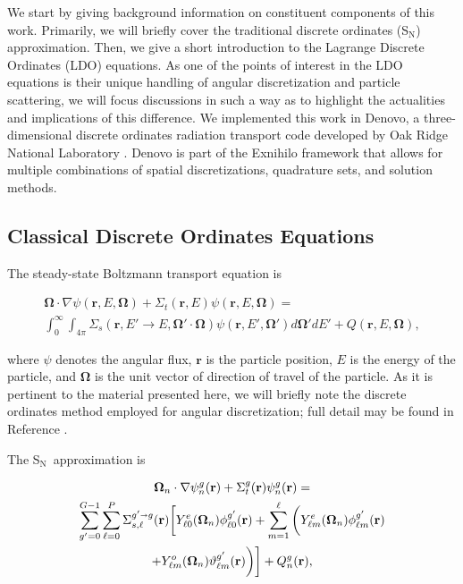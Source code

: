 \documentclass{article} %
\newcommand{\sa}{\shortrightarrow}
\newcommand{\bo}{\mathbf\Omega}
\newcommand{\vecr}{\textbf{r}}
\newcommand{\sn}{S$_\mathrm{N}$}
\newcommand{\Ye}[2]{\ensuremath{Y^e_{#1}(\bo_#2)}}
\newcommand{\Yo}[2]{\ensuremath{Y^o_{#1}(\bo_#2)}}
\begin{document}
We start by giving background information on constituent components of this
work. Primarily, we will briefly cover the traditional discrete ordinates
(\sn) approximation. Then, we give a short introduction to the Lagrange
Discrete Ordinates (LDO) equations. As one of the points of interest in the
LDO equations is their unique handling of angular discretization and particle
scattering, we will focus discussions in such a way as to highlight the
actualities and implications of this difference. We implemented this work in
Denovo, a three-dimensional discrete ordinates radiation transport code
developed by Oak Ridge National Laboratory \cite{denovo}. Denovo is part of
the Exnihilo framework that allows for multiple combinations of spatial
discretizations, quadrature sets, and solution methods.

\subsection{Classical Discrete Ordinates Equations}

The steady-state Boltzmann transport equation is

\begin{multline}
\bo \cdot \nabla \psi(\vecr,E,\bo) + \Sigma_t(\vecr,E) \psi(\vecr,E,\bo) = \\
\int_0^\infty\int_{4\pi} \Sigma_s(\vecr,E'\rightarrow E,\bo'\cdot\bo)
\psi(\vecr,E',\bo')d\bo'dE' + Q(\vecr,E,\bo),
\label{eq:bte}
\end{multline}

\noindent where $\psi$ denotes the angular flux, $\vecr$ is the particle
position, $E$ is the energy of the particle,
and $\bo$ is the unit vector of direction of travel of the particle. As it is
pertinent to the material presented here, we will briefly note the discrete
ordinates method employed for angular discretization; full detail may
be found in Reference \cite{denovo}.

The \sn\ approximation is

\begin{multline}
\bo_n \cdot \nabla \psi_n^g(\vecr) + \Sigma_t^g(\vecr)\psi_n^g(\vecr) = \\
\sum_{g'=0}^{G-1}\sum_{\ell=0}^{P}\Sigma_{s,\ell}^{g'\sa g}(\vecr)
\bigg[\Ye{\ell 0}{n}\phi_{\ell 0}^{g'}(\vecr) + \sum_{m=1}^{\ell}
\bigg(\Ye{\ell m}{n}\phi_{\ell m}^{g'}(\vecr) \\
 + \Yo{\ell m}{n}\vartheta_{\ell m}^{g'}(\vecr)\bigg)\bigg]
+ Q_n^g(\vecr),
\label{eq:sn}
\end{multline}
\end{document}
